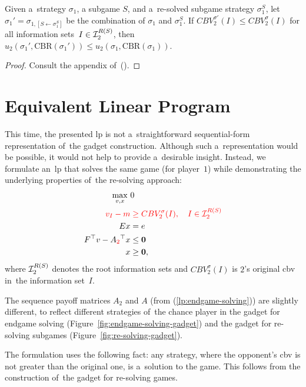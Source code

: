 \begin{thm}
  \label{thm:cf-val-and-utility}
  Given a~strategy $\sigma_1$, a subgame $S$, and a~re-solved subgame strategy $\sigma_1^S$, let $\sigma_1' = \sigma_{1, [S \leftarrow \sigma_1^S]}$ be the combination of $\sigma_1$ and $\sigma_1^S$.
  If $CBV_2^{\sigma'}(I) \leq  CBV_2^{\sigma}(I)$ for all information sets~$I\in\mathcal{I}_2^{R(S)}$, then $u_2(\sigma_1', \textrm{CBR}(\sigma_1')) \leq  u_2(\sigma_1, \textrm{CBR}(\sigma_1))$.
\end{thm}
\begin{proof}
  Consult the appendix of~(\cite{BurchJohansonBowling2014}).
\end{proof}

\section{Equivalent Linear Program}
This time, the presented \acrshort{lp} is not a~straightforward sequential-form representation of~the gadget construction.
Although such a~representation would be possible, it would not help to provide a~desirable insight.
Instead, we formulate an~\acrshort{lp} that solves the same game (for player~$1$) while demonstrating the underlying properties of~the re-solving approach:
\begin{equation}
  \label{lp:cfr-d}
  \begin{split}
    \max_{v, x}\ &0 \\
    \color{red}
      v_I - m &
    \color{red}
      \ge CBV_2^\sigma(I), \quad I \in \mathcal{I}_2^{R(S)}\\ 
    Ex &= e \\
    F^\top v - A_{\color{red}2}^\top x &\le \boldsymbol{0} \\
    x &\ge \boldsymbol{0},
  \end{split}
\end{equation}
where $\mathcal{I}_2^{R(S)}$ denotes the root information sets and $CBV_2^\sigma(I)$ is $2$'s original \acrlong{cbv} in~the information set~$I$.

The sequence payoff matrices $A_2$ and $A$ (from (\ref{lp:endgame-solving})) are slightly different, to reflect different strategies of~the chance player in the gadget for endgame solving (Figure~\ref{fig:endgame-solving-gadget}) and the gadget for re-solving subgames (Figure~\ref{fig:re-solving-gadget}).

The formulation uses the following fact:
any strategy, where the opponent's \acrshort{cbv} is not greater than the original one, is a~solution to the game.
This follows from the construction of~the gadget for re-solving games.

